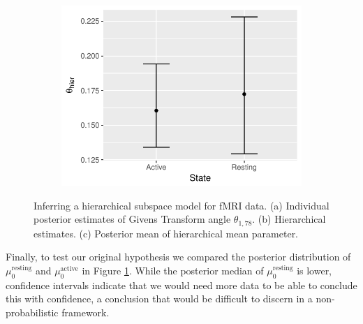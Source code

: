 \documentclass{article}
\begin{document}
\begin{figure}
    \begin{subfigure}[b]{0.3\textwidth}
        \includegraphics[width=\textwidth]{hierMean.pdf}
        \caption{}
        \label{fig:hierMean}
    \end{subfigure}
    \caption{Inferring a hierarchical subspace model for fMRI data. (a) Individual posterior estimates of Givens Transform angle $\theta_{1,78}$. (b) Hierarchical estimates. (c) Posterior mean of hierarchical mean parameter.}\label{fig:fmri}
\end{figure}

Finally, to test our original hypothesis we compared the posterior distribution of $\mu_0^{\mathrm{resting}}$ and $\mu_0^{\mathrm{active}}$ in Figure \ref{fig:hierMean}. While the posterior median of $\mu_0^{\mathrm{resting}}$ is lower, confidence intervals indicate that we would need more data to be able to conclude this with confidence, a conclusion that would be difficult to discern in a non-probabilistic framework.
\end{document}
